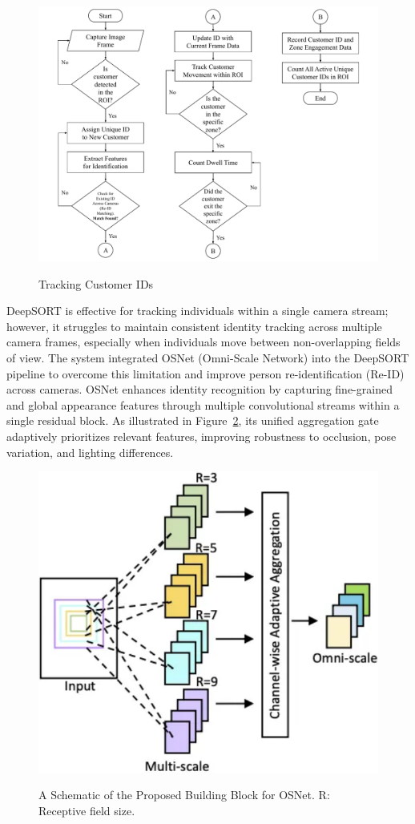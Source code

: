 {\begin{figure}[H]
	\caption[Tracking Customer IDs]{\newline \newline Tracking Customer IDs}
	\centering
	\includegraphics[width=1\linewidth]{figs/3.18.pdf}
	\label{fig:3.18}
\end{figure}

DeepSORT is effective for tracking individuals within a single camera stream; however, it struggles to maintain consistent identity tracking across multiple camera frames, especially when individuals move between non-overlapping fields of view. The system integrated OSNet (Omni-Scale Network) into the DeepSORT pipeline to overcome this limitation and improve person re-identification (Re-ID) across cameras. OSNet enhances identity recognition by capturing fine-grained and global appearance features through multiple convolutional streams within a single residual block. As illustrated in Figure~\ref{fig:3.19}, its unified aggregation gate adaptively prioritizes relevant features, improving robustness to occlusion, pose variation, and lighting differences.

\begin{figure}[H]
	\caption[A Schematic of the Proposed Building Block for OSNet. R: Receptive field size. \citep{Boujou2022}]{\newline \newline A Schematic of the Proposed Building Block for OSNet. R: Receptive field size. \citep{Boujou2022}}
	\centering
	\includegraphics[width=0.50\linewidth]{fig/3.19}
	\label{fig:3.19}
\end{figure}

}
